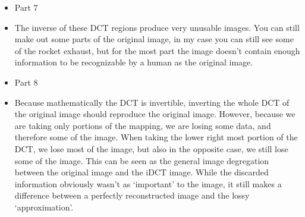 \documentclass{article}
\begin{document}
\begin{itemize}
\begin{itemize}
      \item Part 7
      \item[] The inverse of these DCT regions produce very unusable images. You can still make out some parts of the original image, in my case you can still see some of the rocket exhaust, but for the most part the image doesn't contain enough information to be recognizable by a human as the original image. 
      \item Part 8
      \item[] Because mathematically the DCT is invertible, inverting the whole DCT of the original image should reproduce the original image. However, because we are taking only portions of the mapping, we are losing some data, and therefore some of the image. When taking the lower right most portion of the DCT, we lose most of the image, but also in the opposite case, we still lose some of the image. This can be seen as the general image degregation between the original image and the iDCT image. While the discarded information obviously wasn't as `important' to the image, it still makes a difference between a perfectly reconstructed image and the lossy `approximation'.
    \end{itemize}
\end{itemize}



\end{document}
